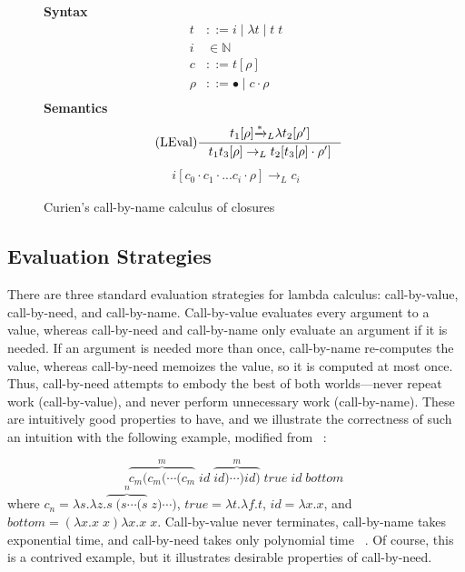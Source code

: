\begin{figure}
\textbf{Syntax}
\begin{align*}
\tag{Term} t &::= i \; | \; \lambda t \; | \; t \; t  \\
\tag{Variable} i &\in \mathbb{N}  \\
\tag{Closure} c &::= t [\rho] \\
\tag{Environment} \rho &::= \bullet \; | \; c \cdot \rho \\
\end{align*}
\textbf{Semantics}
\begin{align*}
\tag{LEval}\inference
{t_1[\rho] {\xrightarrow{* }}_L \lambda t_2[\rho'] }
{t_1 t_3[\rho] \rightarrow_L t_2[t_3[\rho] \cdot \rho'] } 
\end{align*}
\begin{align*}
\tag{LVar} i [c_0 \cdot c_1 \cdot ... c_i \cdot \rho] \rightarrow_L c_i
\end{align*}
\caption{Curien's call-by-name calculus of closures ~\cite{curien1991abstract}}
\label{fig:calcclos}
\end{figure}

\subsection{Evaluation Strategies} \label{sec:eval}

There are three standard evaluation strategies for lambda calculus:
call-by-value, call-by-need, and call-by-name.  Call-by-value evaluates every argument
to a value, whereas call-by-need and call-by-name only evaluate an argument if
it is needed.  If an argument is needed more than once, call-by-name re-computes
the value, whereas call-by-need memoizes the value, so it is computed at most once.
Thus, call-by-need attempts to embody the best of both worlds---never repeat
work (call-by-value), and never perform unnecessary work (call-by-name). These
are intuitively good properties to have, and we illustrate the
correctness of such an intuition with the following example, modified from
~\cite{danvy2013synthetic}:


$$ \overbrace{c_m (c_m (\cdots(c_m}^{m} \; \mathit{id} \;
\overbrace{\mathit{id})\cdots) \mathit{id})}^{m} \; \mathit{true} \;
\mathit{id} \; \mathit{bottom} $$ where $c_n = \lambda s.\lambda z.\overbrace{s
\; (s \cdots (s}^{n} \; z) \cdots) $, $\mathit{true} = \lambda t.\lambda f.t$,
$\mathit{id}=\lambda x.x$, and \\ $\mathit{bottom} = (\lambda x.x \; x) \lambda x.x \; x$.
Call-by-value never terminates,
call-by-name takes exponential time, and call-by-need takes only polynomial time
~\cite{danvy2013synthetic}. Of course, this is a contrived example, but it
illustrates desirable properties of call-by-need.

